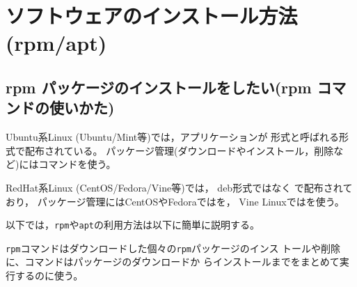 \documentclass{jreport}
\begin{document}
\chapter{ソフトウェアのインストール方法(rpm/apt)}


\section{rpm パッケージのインストールをしたい(rpm コマンドの使いかた)}


Ubuntu系Linux (Ubuntu/Mint等)では，アプリケーションが  形式と呼ばれる形式で配布されている。
パッケージ管理(ダウンロードやインストール，削除など)にはコマンドを使う。

RedHat系Linux (CentOS/Fedora/Vine等)では，
deb形式ではなく で配布されており，
パッケージ管理にはCentOSやFedoraではを，
Vine Linuxではを使う。

以下では，\verb|rpm|や\verb|apt|の利用方法は以下に簡単に説明する。

\verb|rpm|コマンドはダウンロードした個々の\verb|rpm|パッケージのインス
トールや削除に、コマンドはパッケージのダウンロードか
らインストールまでをまとめて実行するのに使う。
\end{document}
